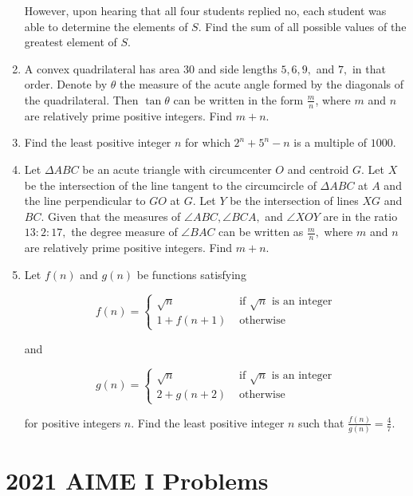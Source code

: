 \documentclass{article}
\begin{document}
\begin{enumerate}[label=\arabic*., itemsep=0.5em]
However, upon hearing that all four students replied no, each student was able to determine the elements of \(S\). Find the sum of all possible values of the greatest element of \(S\).\par \vspace{0.5em}\item A convex quadrilateral has area \(30\) and side lengths \(5, 6, 9,\) and \(7,\) in that order. Denote by \(\theta\) the measure of the acute angle formed by the diagonals of the quadrilateral. Then \(\tan \theta\) can be written in the form \(\tfrac{m}{n}\), where \(m\) and \(n\) are relatively prime positive integers. Find \(m + n\).\par \vspace{0.5em}\item Find the least positive integer \(n\) for which \(2^n + 5^n - n\) is a multiple of \(1000\).\par \vspace{0.5em}\item Let \(\Delta ABC\) be an acute triangle with circumcenter \(O\) and centroid \(G\). Let \(X\) be the intersection of the line tangent to the circumcircle of \(\Delta ABC\) at \(A\) and the line perpendicular to \(GO\) at \(G\). Let \(Y\) be the intersection of lines \(XG\) and \(BC\). Given that the measures of \(\angle ABC, \angle BCA, \) and \(\angle XOY\) are in the ratio \(13 : 2 : 17, \) the degree measure of \(\angle BAC\) can be written as \(\frac{m}{n},\) where \(m\) and \(n\) are relatively prime positive integers. Find \(m+n\).\par \vspace{0.5em}\item Let \(f(n)\) and \(g(n)\) be functions satisfying

\begin{equation*}
f(n) = 
\begin{cases}
\sqrt{n} & \text{ if } \sqrt{n} \text{ is an integer}\\
1 + f(n+1) & \text{ otherwise}
\end{cases}
\end{equation*}

and

\begin{equation*}
g(n) = \begin{cases}\sqrt{n} & \text{ if } \sqrt{n} \text{ is an integer}\\
2 + g(n+2) & \text{ otherwise}
\end{cases}
\end{equation*}

for positive integers \(n\). Find the least positive integer \(n\) such that \(\tfrac{f(n)}{g(n)} = \tfrac{4}{7}\).\par \vspace{0.5em}\end{enumerate}\newpage\section*{2021 AIME I Problems}
\end{document}
